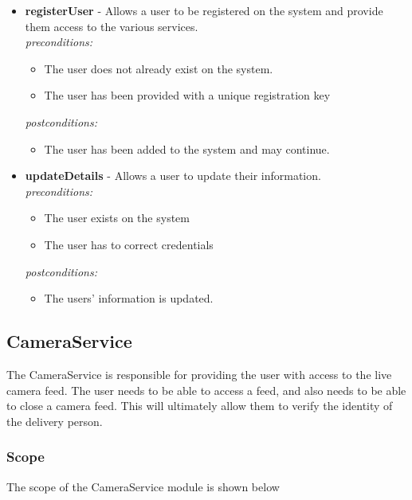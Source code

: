 \documentclass[a4paper,12pt]{article}
\begin{document}
\begin{itemize}
		\item \textbf{registerUser} - Allows a user to be registered on the system and provide them access to the various services.\\[0.5cm]
		\textit{preconditions:}
			\begin{itemize}
				\item The user does not already exist on the system.
				\item The user has been provided with a unique registration key
			\end{itemize}
		
		\textit{postconditions:}
			\begin{itemize}
				\item The user has been added to the system and may continue.\\[0.5cm]
			\end{itemize}
			
		\item \textbf{updateDetails} - Allows a user to update their information.\\[0.5cm]
		\textit{preconditions:}
			\begin{itemize}
				\item The user exists on the system
				\item The user has to correct credentials
			\end{itemize}
		
		\textit{postconditions:}
			\begin{itemize}
				\item The users' information is updated.
			\end{itemize}
	\end{itemize}
	
	\newpage
	
	\subsection{CameraService}
	The CameraService is responsible for providing the user with access to the live camera feed. The user needs to be able to access a feed, and also needs to be able to close a camera feed. This will ultimately allow them to verify the identity of the delivery person. 
	
	\subsubsection{Scope}
	The scope of the CameraService module is shown below
	
\end{document}
